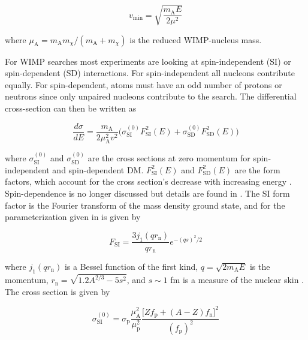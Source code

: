 \begin{equation}
v_{\mathrm{min}} = \sqrt{\frac{m_{\mathrm{A}} E}{2 \mu^{2}}}
\end{equation}

\noindent where $\mu_{\mathrm{A}} = m_{\mathrm{A}} m_{\chi} /( m_{\mathrm{A}} + m_{\chi})$ is the reduced WIMP-nucleus mass.

For WIMP searches most experiments
are looking at spin-independent (SI) or spin-dependent (SD) interactions.  For spin-independent all nucleons
contribute equally.  For spin-dependent, atoms must have an odd number
of protons or neutrons since only unpaired nucleons contribute to the search.  The differential cross-section can then be written as

\begin{equation} \label{eq:diff_sigma_si}
\frac{d \sigma}{dE} = \frac{m_{\mathrm{A}}}{2 \mu_{\mathrm{A}}^{2} v^{2}} \big( \sigma_{\mathrm{SI}}^{(0)} F_{\mathrm{SI}}^{2}(E) +
\sigma_{\mathrm{SD}}^{(0)} F_{\mathrm{SD}}^{2}(E) \big)
\end{equation}

\noindent where $\sigma_{\mathrm{SI}}^{(0)}$ and $\sigma_{\mathrm{SD}}^{(0)}$ are the cross sections at zero momentum for
spin-independent and spin-dependent DM.  $F_{\mathrm{SI}}^{2}(E)$ and $F_{\mathrm{SD}}^{2}(E)$ are the form factors, which
account for the cross section's decrease with increasing energy .  Spin-dependence is no longer discussed but details
are found in .  The SI form factor is
the Fourier transform of the mass density ground state, and for the parameterization given in  is given by

\begin{equation}
F_{\mathrm{SI}} = \frac{3 j_{1}(qr_{\mathrm{n}})}{qr_{\mathrm{n}}} e^{-(qs)^{2}/2}
\end{equation}

\noindent where $j_1(q r_{\mathrm{n}})$ is a Bessel function of the first kind, $q = \sqrt{2m_{\mathrm{A}}E}$ is the momentum,
$r_{\mathrm{n}} = \sqrt{1.2A^{2/3} - 5s^{2}}$, and $s \sim 1$ fm is a measure of the nuclear skin .  The
cross section is given by

\begin{equation} \label{eq:sigma_si}
\sigma_{\mathrm{SI}}^{(0)} = \sigma_{\mathrm{p}} \frac{\mu_{\mathrm{A}}^{2}}{\mu_{\mathrm{p}}^{2}} \frac{\big[ Z f_{\mathrm{p}} +
(A - Z) f_{\mathrm{n}} \big]^{2}}{(f_{\mathrm{p}})^{2}}
\end{equation}

